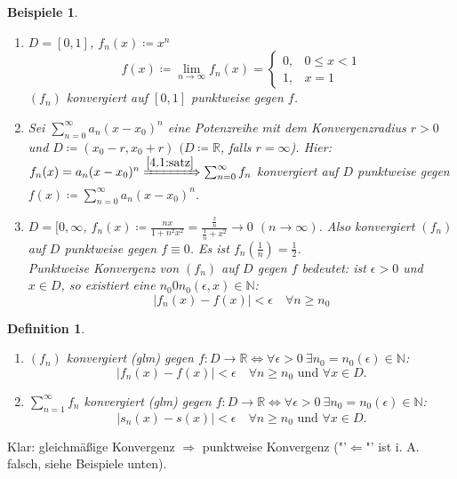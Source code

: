 \documentclass[12pt]{extreport} %
\newcommand{\N}{\mathbb{N}}
\newcommand{\R}{\mathbb{R}}
\theoremstyle{named}
\theoremstyle{dotless}
\newtheorem*{beispiele}{Beispiele}
\newtheorem*{definition}{Definition}
\begin{document}
\begin{beispiele} ~\
	\begin{enumerate}
		\item $D = [0,1]$, $f_{n}(x) \coloneqq x^{n}$
			$$ f(x) \coloneqq \lim_{n\rightarrow\infty} f_{n}(x) = \begin{cases} 0, & 0 \leq x < 1 \\  1, & x = 1 \end{cases} $$
			$(f_{n})$ konvergiert auf $[0, 1]$ punktweise gegen $f$.
		\item Sei $\sum_{n=0}^{\infty} a_{n} (x-x_{0})^{n}$ eine Potenzreihe mit dem Konvergenzradius $r > 0$ und $D \coloneqq (x_{0} - r, x_{0} + r)$ $(D \coloneqq \R$, falls $r = \infty$). Hier: $f_{n}(x) = a_{n} (x - x_{0})^{n} \xRightarrow[]{\ref{4.1:satz}} \sum_{n=0}^{\infty} f_{n}$ konvergiert auf $D$ punktweise gegen $f(x) \coloneqq \sum_{n=0}^{\infty} a_{n} (x-x_{0})^{n}$.
		\item $D = [0, \infty$, $f_{n}(x) \coloneqq \frac{nx}{1+n^{2}x^{2}} = \frac{\frac{x}{n}}{\frac{1}{n} + x^{2}} \rightarrow 0$ $(n \rightarrow \infty)$. Also konvergiert $(f_{n})$ auf $D$ punktweise gegen $f \equiv 0$. Es ist $f_{n}(\frac{1}{n}) = \frac{1}{2}$. \\
			Punktweise Konvergenz von $(f_{n})$ auf $D$ gegen $f$ bedeutet: ist $\epsilon > 0$ und $x \in D$, so existiert eine $n_{0} 0 n_{0}(\epsilon, x) \in \N$:
			$$ |f_{n}(x) - f(x)| < \epsilon \quad \forall n \geq n_{0} $$
	\end{enumerate}
\end{beispiele}


\begin{definition} ~\
	\begin{enumerate}
		\item $(f_{n})$ konvergiert  (glm) gegen $f \colon D \rightarrow \R \iff \forall \epsilon > 0 ~\exists n_{0} = n_{0}(\epsilon) \in \N$:
			$$ |f_{n}(x) - f(x)|< \epsilon \quad \forall n \geq n_{0} \text{ und } \forall x \in D. $$
		\item $\sum_{n=1}^{\infty} f_{n}$  konvergiert \text{auf D gleichmä{\ss}ig} (glm) gegen $f \colon D \rightarrow \R \iff \forall \epsilon > 0 ~\exists n_{0} = n_{0}(\epsilon) \in \N$:
			$$ |s_{n}(x) - s(x)|< \epsilon \quad \forall n \geq n_{0} \text{ und } \forall x \in D. $$
	\end{enumerate}
\end{definition}

Klar: gleichmä{\ss}ige Konvergenz $\Rightarrow$ punktweise Konvergenz ("'$\Leftarrow$"' ist i. A. falsch, siehe Beispiele unten).
\end{document}
